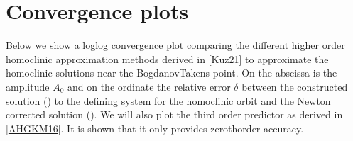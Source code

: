 \documentclass[letterpaper,10pt,english]{jupyterBook}
\begin{document}
\section{Convergence plots}
\label{\detokenize{BogdanovTakens:convergence-plots}}
\sphinxAtStartPar
Below we show a log\sphinxhyphen{}log convergence plot comparing the different
higher order homoclinic approximation methods derived in {[}\hyperlink{cite.references:id3}{Kuz21}{]}
to approximate the homoclinic solutions near the Bogdanov\sphinxhyphen{}Takens point.
On the abscissa is the amplitude \(A_0\) and on the ordinate the relative error
\(\delta\) between the constructed solution () to the defining system for the
homoclinic orbit and the Newton corrected solution ().
We will also plot the third order predictor as derived in
{[}\hyperlink{cite.references:id2}{AHGKM16}{]}. It is shown that it only provides zeroth\sphinxhyphen{}order
accuracy.
\end{document}
